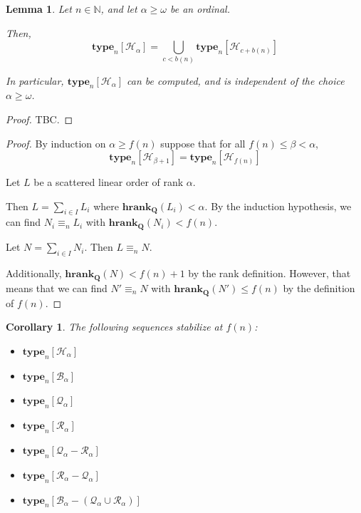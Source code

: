 \documentclass{article}
\newtheorem{corollary}{Corollary}
\newtheorem{lemma}{Lemma}
\newcommand{\brackets}[1]{\left[ {#1} \right]}
\newcommand{\hrank}[1]{\mathbf{hrank}_{\qq}\left( #1 \right)}
\newcommand{\qq}{\mathbf{Q}}
\newcommand{\NN}{\mathbb{N}}
\newcommand{\type}[2]{\mathbf{type}_{#1} \brackets{#2}}
\begin{document}
\begin{lemma}
  Let $n \in \NN$, and let $\alpha \ge \omega$ be an ordinal.

  Then,
  $$\type{n}{\mathcal{H}_{\alpha}} = \bigcup_{c < b(n)}{\type{n}{\mathcal{H}_{c + b(n)}}}$$

  In particular, $\type{n}{\mathcal{H}_{\alpha}}$ can be
  computed, and is independent of the choice $\alpha \ge \omega$.
\end{lemma}

\begin{proof}
  TBC.
\end{proof}

\begin{proof}
  By induction on $\alpha \ge f(n)$
  suppose that for all $f(n) \le \beta < \alpha$,
  $$\type{n}{\mathcal{H}_{\beta + 1}} = \type{n}{\mathcal{H}_{f(n)}}$$

  Let $L$ be a scattered linear order of rank $\alpha$.

  Then $L = \sum_{i \in I} L_i$ where $\hrank{L_i} < \alpha$.
  By the induction hypothesis, we can find $N_i \equiv_n L_i$ with $\hrank{N_i} < f(n)$.

  Let $N = \sum_{i \in I} N_i$. Then $L \equiv_n N$.
  
  Additionally, $\hrank{N} < f(n) + 1$ by the rank definition. However, that means that 
  we can find $N' \equiv_n N$ with $\hrank{N'} \le f(n)$ by the definition of $f(n)$.
\end{proof}

\begin{corollary}
  The following sequences stabilize at $f(n)$:

  \begin{itemize}
    \item $\type{n}{\mathcal{H}_{\alpha}}$
    \item $\type{n}{\mathcal{B}_{\alpha}}$
    \item $\type{n}{\mathcal{Q}_{\alpha}}$
    \item $\type{n}{\mathcal{R}_{\alpha}}$
    \item $\type{n}{\mathcal{Q}_{\alpha} - \mathcal{R}_{\alpha}}$
    \item $\type{n}{\mathcal{R}_{\alpha} - \mathcal{Q}_{\alpha}}$
    \item $\type{n}{\mathcal{B}_{\alpha} - (\mathcal{Q}_{\alpha} \cup \mathcal{R}_{\alpha})}$
  \end{itemize}
\end{corollary}
\end{document}
